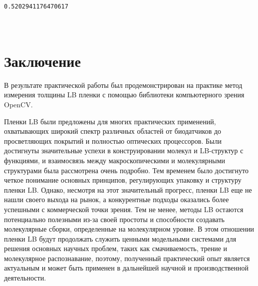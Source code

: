 \documentclass[11pt]{article}
\makeatletter
\newcommand{\boxspacing}{\kern\kvtcb@left@rule\kern\kvtcb@boxsep}
\newcommand{\prompt}[4]{
        {\ttfamily\llap{{\color{#2}[#3]:\hspace{3pt}#4}}\vspace{-\baselineskip}}
    }
\makeatother
\begin{document}
    \begin{Verbatim}[commandchars=\\\{\}]
0.5202941176470617
    \end{Verbatim}

    \begin{tcolorbox}[breakable, size=fbox, boxrule=1pt, pad at break*=1mm,colback=cellbackground, colframe=cellborder]
\prompt{In}{incolor}{ }{\boxspacing}
\begin{Verbatim}[commandchars=\\\{\}]

\end{Verbatim}
\end{tcolorbox}

    \begin{tcolorbox}[breakable, size=fbox, boxrule=1pt, pad at break*=1mm,colback=cellbackground, colframe=cellborder]
\prompt{In}{incolor}{ }{\boxspacing}
\begin{Verbatim}[commandchars=\\\{\}]

\end{Verbatim}
\end{tcolorbox}

    \begin{tcolorbox}[breakable, size=fbox, boxrule=1pt, pad at break*=1mm,colback=cellbackground, colframe=cellborder]
\prompt{In}{incolor}{ }{\boxspacing}
\begin{Verbatim}[commandchars=\\\{\}]

\end{Verbatim}
\end{tcolorbox}


\section{Заключение}
В результате практической работы был продемонстрирован на практике метод измерения толщины LB пленки с помощью библиотеки компьютерного зрения OpenCV.

Пленки LB были предложены для многих практических применений, охватывающих широкий спектр различных областей от биодатчиков до просветляющих покрытий и полностью оптических процессоров. Были достигнуты значительные успехи в конструировании молекул и LB-структур с функциями, и взаимосвязь между макроскопическими и молекулярными структурами была рассмотрена очень подробно. Тем временем было достигнуто четкое понимание основных принципов, регулирующих упаковку и структуру пленки LB. Однако, несмотря на этот значительный прогресс, пленки LB еще не нашли своего выхода на рынок, а конкурентные подходы оказались более успешными с коммерческой точки зрения. Тем не менее, методы LB остаются потенциально полезными из-за своей простоты и способности создавать молекулярные сборки, определенные на молекулярном уровне. В этом отношении пленки LB будут продолжать служить ценными модельными системами для решения основных научных проблем, таких как смачиваемость, трение и молекулярное распознавание, поэтому, полученный практический опыт является актуальным и может быть применен в дальнейшей научной и производственной деятельности.
\end{document}
